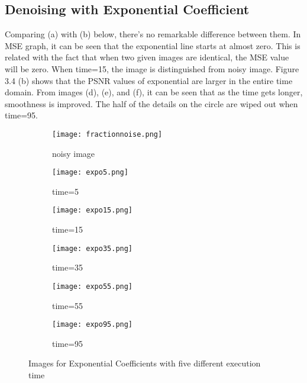 \documentclass[12pt]{report}
\begin{document}
\begin{tableofcontents}
			\subsection{Denoising with Exponential Coefficient}
Comparing (a) with (b) below, there's no remarkable difference between them. In MSE graph, it can be seen that the exponential line starts at almost zero. This is related with the fact that when two given images are identical, the MSE value will be zero. When time=15, the image is distinguished from noisy image. Figure 3.4 (b) shows that the PSNR values of exponential are larger in the entire time domain. From images (d), (e), and (f), it can be seen that as the time gets longer, smoothness is improved. The half of the details on the circle are wiped out when time=95.
			\begin{figure}[H]
				\centering
				\begin{subfigure}{0.325\textwidth}
					\texttt{[image: fractionnoise.png]}
					\caption{noisy image}
				\end{subfigure}
				\begin{subfigure}{0.325\textwidth}
					\texttt{[image: expo5.png]}
					\caption{time=5}
				\end{subfigure}
				\begin{subfigure}{0.325\textwidth}
					\texttt{[image: expo15.png]}
					\caption{time=15}
				\end{subfigure}
				\begin{subfigure}{0.325\textwidth}
					\texttt{[image: expo35.png]}
					\caption{time=35}
				\end{subfigure}
				\begin{subfigure}{0.325\textwidth}
					\texttt{[image: expo55.png]}
					\caption{time=55}
				\end{subfigure}
				\begin{subfigure}{0.325\textwidth}
					\texttt{[image: expo95.png]}
					\caption{time=95}
				\end{subfigure}
		\caption{Images for Exponential Coefficients with five different execution time}
			\end{figure}

\end{tableofcontents}
\end{document}
